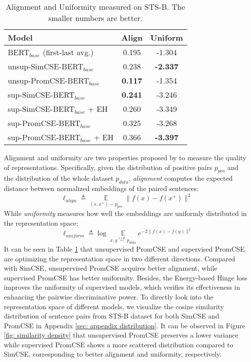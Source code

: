 \documentclass[11pt]{article}
\begin{document}
\begin{table}[t]
\small
\centering
\begin{tabular}{lcc}
\toprule
\textbf{Model} & \textbf{Align} & \textbf{Uniform}    \\
\midrule
BERT$_{base}$ (first-last avg.)   & 0.195 & -1.304   \\
unsup-SimCSE-BERT$_{base}$   & 0.238 & \textbf{-2.337} \\
unsup-PromCSE-BERT$_{base}$  & \textbf{0.117} & -1.354 \\
\midrule
sup-SimCSE-BERT$_{base}$   & \textbf{0.241} & -3.246 \\
sup-SimCSE-BERT$_{base}$ + EH   & 0.260 & -3.349 \\
sup-PromCSE-BERT$_{base}$  & 0.325 & -3.268 \\
sup-PromCSE-BERT$_{base}$ + EH  & 0.366 & \textbf{-3.397} \\
\bottomrule
\end{tabular}
\caption{\label{tab: align}
Alignment and Uniformity measured on STS-B. The smaller numbers are better. 
}
\end{table}







Alignment and uniformity are two properties proposed by \cite{wang2020alighment} to measure the quality of representations. 
Specifically, given the distribution of positive pairs $p_{pos}$ and the distribution of the whole dataset $p_{data}$, \textit{alignment} computes the expected distance between normalized embeddings of the paired sentences:
\begin{equation}
\ell_{align}\triangleq
\mathop{\mathbb{E}}\limits_{(x,x^+)\backsim p_{pos}}
\parallel f(x)-f(x^+) \parallel ^ 2
\end{equation}
While \textit{uniformity} measures how well the embeddings are uniformly distributed in the representation space:
\begin{equation}
\ell_{uniform}\triangleq
\log\mathop{\mathbb{E}}\limits_{x,y \mathop{\backsim}\limits^{i.i.d.} p_{data}}
e^{-2\parallel f(x)-f(y) \parallel ^ 2}
\end{equation}
It can be seen in Table \ref{tab: align} that unsupervised PromCSE and supervised PromCSE are optimizing the representation space in two different directions. Compared with SimCSE, unsupervised PromCSE acquires better alignment, while supervised PromCSE has better uniformity. 
Besides, the Energy-based Hinge loss improves the uniformity of supervised models, which verifies its effectiveness in enhancing the pairwise discriminative power.
To directly look into the representation space of different models, we visualize the cosine similarity distribution of sentence pairs from STS-B dataset for both SimCSE and PromCSE in Appendix \ref{sec: appendix distribution}. 
It can be observed in Figure \ref{fig: similarity density} that unsupervised PromCSE preserves a lower variance while supervised PromCSE shows a more scattered distribution compared to SimCSE, corresponding to better alignment and uniformity, respectively.
\end{document}
